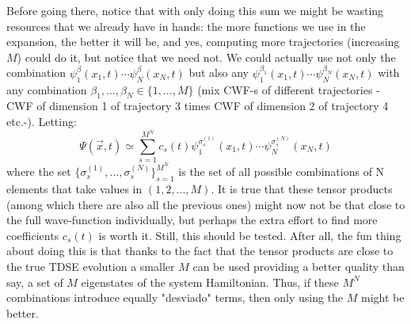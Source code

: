 \documentclass[11pt, a4paper]{article} %
\begin{document}
Before going there, notice that with only doing this sum we might be wasting resources that we already have in hands: the more functions we use in the expansion, the better it will be, and yes, computing more trajectories (increasing $M$) could do it, but notice that we need not. We could actually use not only the combination $\psi^\beta_1(x_1,t)\cdots \psi^\beta_N(x_N,t)$ but also any $\psi^{\beta_1}_1(x_1,t)\cdots \psi^{\beta_N}_N(x_N,t)$ with any combination $\beta_1,...,\beta_N \in \{1,...,M\}$ (mix CWF-s of different trajectories -CWF of dimension 1 of trajectory 3 times CWF of dimension 2 of trajectory 4 etc.-). Letting:
\begin{equation}\label{CWF.LinComb}\tag{CWF.LinComb}
\Psi(\vec{x},t)\simeq \sum_{s=1}^{M^N} c_s(t) \psi_1^{\sigma^{(1)}_s}(x_1,t)\cdots \psi_N^{\sigma^{(N)}_s}(x_N,t)
\end{equation}
where the set $\{\sigma^{(1)}_s, ..., \sigma^{(N)}_s\}_{s=1}^{M^N}$ is the set of all possible combinations of N elements that take values in $(1,2,..., M)$. It is true that these tensor products (among which there are also all the previous ones) might now not be that close to the full wave-function individually, but perhaps the extra effort to find more coefficients $c_s(t)$ is worth it. Still, this should be tested. After all, the fun thing about doing this is that thanks to the fact that the tensor products are close to the true TDSE evolution a smaller $M$ can be used providing a better quality than say, a set of $M$ eigenstates of the system Hamiltonian. Thus, if these $M^N$ combinations introduce equally "desviado" terms, then only using the $M$ might be better.
\end{document}
